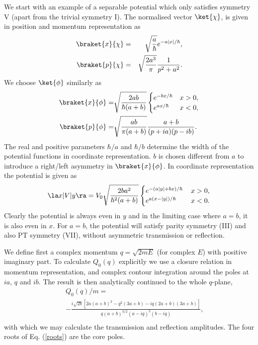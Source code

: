 We start with an example of a separable potential which only satisfies symmetry V (apart from the trivial symmetry I). The normalised vector $\ket{\chi}$, is given in position and momentum representation as
%
\begin{eqnarray}
	\braket{x}{\chi}&=&\sqrt{\frac{a}{\hbar}} e^{-a \left| x \right|/\hbar},
	\nonumber \\
	\braket{p}{\chi}&=& \sqrt{\frac{2 a^3}{\pi}} \frac{1}{p^2+a^2}.
\end{eqnarray}
%
We choose $\ket{\phi}$ similarly as
%
\begin{eqnarray}
	\braket{x}{\phi}=&\sqrt{\frac{2ab}{\hbar (a+b)}} \begin{cases}
	e^{-b x/\hbar} &x>0,\\ e^{a x/\hbar}  &x<0,
	\end{cases}\nonumber \\
	\braket{p}{\phi}=& \sqrt{\frac{ab}{\pi (a+b)}}\frac{a+b}{(p+i a)(p-i b)}.
\end{eqnarray}
%
The real and positive parameters $\hbar/ a$ and $\hbar/ b$ determine the width of the potential functions in coordinate representation.
$b$ is chosen different from $a$ to introduce a right/left  asymmetry in $\braket{x}{\phi}$.
In coordinate representation the potential is given as
%
\begin{eqnarray}
	\la x|V|y\ra = V_{0} \sqrt{\frac{2 b a^2}{\hbar^2 (a+b)}} \begin{cases}
	e^{-(a \left| y \right|+b x)/\hbar} \, &x>0,\\ e^{a (x-\left| y \right|)/\hbar} \,  &x<0.
\end{cases} \label{TRpot}
\end{eqnarray}
%
Clearly the potential is always even in $y$ and in the limiting case where $a=b$, it is also even in $x$. For $a=b$, the potential will satisfy parity symmetry (III) and also PT symmetry (VII), without asymmetric transmission or reflection.

We define first a complex momentum $q=\sqrt{2 m E}$ (for complex $E$) with positive imaginary part.
To calculate $Q_{0}(q)$ explicitly we use a closure relation in momentum representation, and
complex contour integration around the poles at $ia$, $q$ and $ib$.
The result is then analytically continued to the whole $q$-plane,
%
\begin{eqnarray}
&&Q_{0}(q)/m=
\nonumber\\
&&-\frac{i \sqrt{2b} \left[2 a (a+b)^2-q^2 (3 a+b)-i q (2 a+b) (3 a+b)\right]}{q (a+b)^{3/2} (a-i q)^2 (b-i q)},
\nonumber\\
\label{eq:ResolvantVSymm}
\end{eqnarray}
%
with which we may calculate the transmission and reflection amplitudes.
The four roots of Eq. (\ref{roots}) are the core poles.

